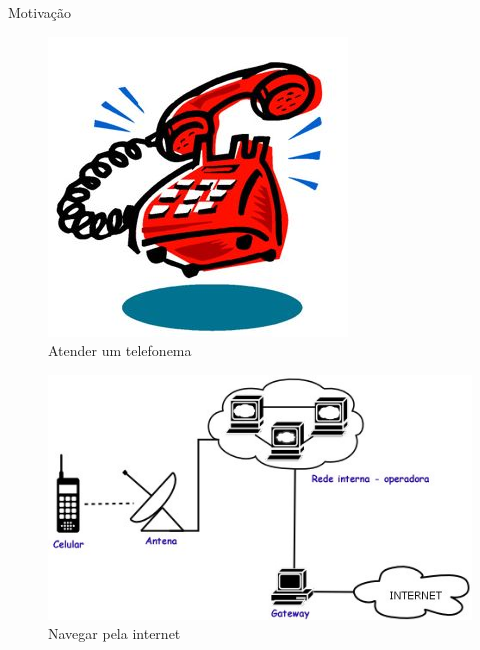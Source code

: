   \begin{frame}{Motivação}
   \begin{figure}[h]
     \centering
     \includegraphics[scale=0.3]{telephone-ringing.jpg}
     \caption{Atender um telefonema\cite{Plank:2004}}
     \label{fig9:tel}
   \end{figure}


   \begin{figure}[h]
     \centering
     \includegraphics[scale=0.2]{internet-celular.jpg}
     \caption{Navegar pela internet\cite{Plank:2004}}
     \label{fig10:internet}
   \end{figure}
  \end{frame}

